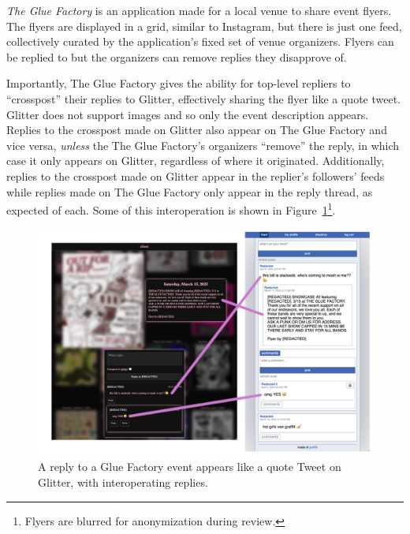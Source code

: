 \emph{The Glue Factory} is an application made for a local
venue to share event flyers.
The flyers are displayed in a grid, similar to Instagram,
but there is just one feed, collectively curated by
the application's fixed set of venue organizers.
Flyers can be replied to but the organizers can remove replies they disapprove of.

Importantly, The Glue Factory gives the ability for
top-level repliers to ``crosspost'' their replies
to Glitter, effectively sharing the flyer like a quote tweet.
Glitter does not support images and so only the
event description appears.
Replies to the crosspost made on Glitter also appear on The Glue Factory
and vice versa, \emph{unless} the The Glue Factory's organizers ``remove'' the reply,
in which case it only appears on Glitter, regardless of where it originated.
Additionally, replies to the crosspost made on Glitter appear in the replier's followers' feeds while replies made on The Glue Factory only appear in the reply thread, as expected of each.
Some of this interoperation is shown in Figure~\ref{case-studies:fig:gloof-and-glitter}\footnote{
Flyers are blurred for anonymization during review.
}.

\begin{figure}[h]
    \centering
    \includegraphics[width=\textwidth]{paper/figures/gloof-and-glitter.png}
    \caption{A reply to a Glue Factory event appears like a quote Tweet on Glitter, with
    interoperating replies.}

    \label{case-studies:fig:gloof-and-glitter}
\end{figure}


